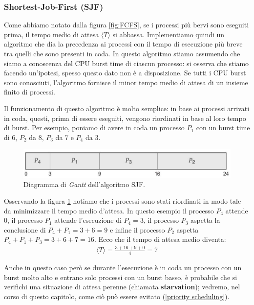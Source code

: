 \subsubsection{Shortest-Job-First (SJF)}\label{SJF}
Come abbiamo notato dalla figura \ref{fig:FCFS}, se i processi più bervi sono eseguiti prima, il tempo medio di attesa $\langle T \rangle$ si abbassa. Implementiamo quindi un algoritmo che dia la precedenza ai processi con il tempo di esecuzione più breve tra quelli che sono presenti in coda. In questo algoritmo stiamo assumendo che siamo a conoscenza del CPU burst time di ciascun processo: si osserva che stiamo facendo un'ipotesi, spesso questo dato non è a disposizione. Se tutti i CPU burst sono conosciuti, l'algoritmo fornisce il minor tempo medio di attesa di un insieme finito di processi.

Il funzionamento di questo algoritmo è molto semplice: in base ai processi arrivati in coda, questi, prima di essere eseguiti, vengono riordinati in base al loro tempo di burst. Per esempio, poniamo di avere in coda un processo $P_1$ con un burst time di 6, $P_2$ da 8, $P_3$ da 7 e $P_4$ da 3.
\begin{figure}[h]
    \centering
    \includegraphics[width = .7\textwidth]{../res/imgs/CPU scheduling/SJF.png}
    \caption{Diagramma di \textit{Gantt} dell'algoritmo SJF.}
    \label{fig:SJF}
\end{figure}
Osservando la figura \ref{fig:SJF} notiamo che i processi sono stati riordinati in modo tale da minimizzare il tempo medio d'attesa. In questo esempio il processo $P_4$ attende 0, il processo $P_1$ attende l'esecuzione di $P_4 = 3$, il processo $P_3$ aspetta la conclusione di $P_4 + P_1 = 3 + 6 = 9$ e infine il processo $P_2$ aspetta $P_4 + P_1 + P_3 = 3 + 6 + 7 = 16$. Ecco che il tempo di attesa medio diventa:
\begin{gather*}
    \langle T \rangle = \frac{3 + 16 + 9 + 0}{4} = 7
\end{gather*}

Anche in questo caso però se durante l'esecuzione è in coda un processo con un burst molto alto e entrano solo processi con un burst basso, è probabile che si verifichi una situazione di attesa perenne (chiamata \textbf{starvation}); vedremo, nel corso di questo capitolo, come ciò può essere evitato (\ref{priority scheduling}).
% 
